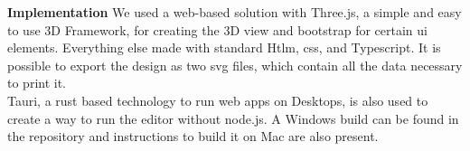 \textbf{Implementation}
We used a web-based solution with Three.js, a simple and easy to use 3D Framework, for creating the 3D view
and bootstrap for certain ui elements. Everything else made with standard Htlm, css, and Typescript.
It is possible to export the design as two svg files, which contain all the data necessary to print it. \\ 
Tauri, a rust based technology to run web apps on Desktops, is also used to create a way to run the editor without node.js.
A Windows build can be found in the repository and instructions to build it on Mac are also present.
